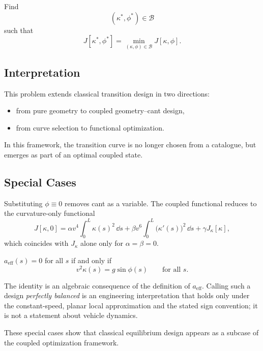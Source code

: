 \begin{definition}
Find
\[
(\kappa^\ast,\phi^\ast)\in\mathcal{B}
\]
such that
\[
J[\kappa^\ast,\phi^\ast]
=
\min_{(\kappa,\phi)\in\mathcal{B}} J[\kappa,\phi].
\]
\end{definition}

\subsection{Interpretation}

This problem extends classical transition design in two directions:
\begin{itemize}
\item from pure geometry to coupled geometry--cant design,
\item from curve selection to functional optimization.
\end{itemize}

In this framework, the transition curve is no longer chosen from a
catalogue, but emerges as part of an optimal coupled state.

\subsection{Special Cases}

\begin{corollary}
\label{cor:coupled-substitution-phi-zero}
Substituting \(\phi\equiv 0\) removes cant as a variable. The coupled
functional reduces to the curvature-only functional
\[
J[\kappa,0]
=
\alpha v^4\int_0^L\kappa(s)^2\,\dd s
+
\beta v^6\int_0^L\bigl(\kappa'(s)\bigr)^2\,\dd s
+
\gamma J_\kappa[\kappa],
\]
which coincides with \(J_\kappa\) alone only for \(\alpha=\beta=0\).
\end{corollary}

\begin{corollary}
\label{cor:balance-identity}
\(a_{\mathrm{eff}}(s)=0\) for all \(s\) if and only if
\[
v^2 \kappa(s)=g\sin\phi(s)
\qquad\text{for all } s .
\]
\end{corollary}

The identity is an algebraic consequence of the definition of
\(a_{\mathrm{eff}}\). Calling such a design \emph{perfectly balanced} is an
engineering interpretation that holds only under the constant-speed,
planar local approximation and the stated sign convention; it is not a
statement about vehicle dynamics.

These special cases show that classical equilibrium design appears as a
subcase of the coupled optimization framework.

